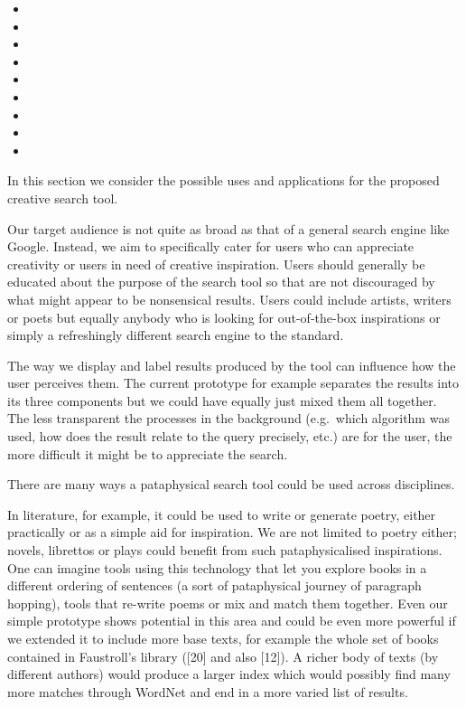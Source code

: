 \begin{draft}
\begin{itemize}
  \item
  \item
  \item
  \item
  \item
  \item
  \item
  \item
  \item
\end{itemize}






  In this section we consider the possible uses and applications for the proposed creative search tool.

  Our target audience is not quite as broad as that of a general search engine like Google. Instead, we aim to specifically cater for users who can appreciate creativity or users in need of creative inspiration. Users should generally be educated about the purpose of the search tool so that are not discouraged by what might appear to be nonsensical results. Users could include artists, writers or poets but equally anybody who is looking for out-of-the-box inspirations or simply a refreshingly different search engine to the standard.

  The way we display and label results produced by the tool can influence how the user perceives them. The current prototype for example separates the results into its three components but we could have equally just mixed them all together. The less transparent the processes in the background (e.g.\ which algorithm was used, how does the result relate to the query precisely, etc.) are for the user, the more difficult it might be to appreciate the search.

  There are many ways a pataphysical search tool could be used across disciplines.

  In literature, for example, it could be used to write or generate poetry, either practically or as a simple aid for inspiration. We are not limited to poetry either; novels, librettos or plays could benefit from such pataphysicalised inspirations. One can imagine tools using this technology that let you explore books in a different ordering of sentences (a sort of pataphysical journey of paragraph hopping), tools that re-write poems or mix and match them together. Even our simple prototype shows potential in this area and could be even more powerful if we extended it to include more base texts, for example the whole set of books contained in Faustroll’s library ([20] and also [12]). A richer body of texts (by different authors) would produce a larger index which would possibly find many more matches through WordNet and end in a more varied list of results.


\end{draft}

